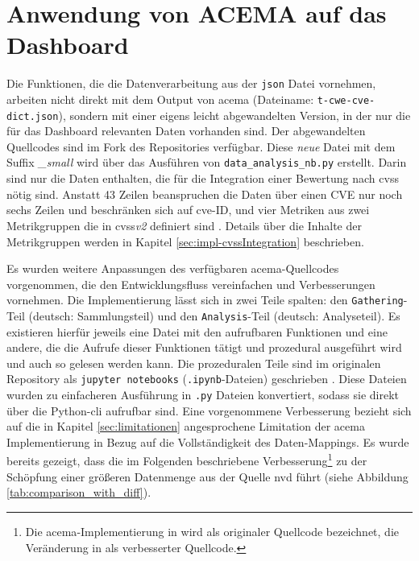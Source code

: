 \section[Anwendung von ACEMA]{Anwendung von ACEMA auf das Dashboard}
\label{sec:impl-anwendungVonAcema}

Die Funktionen, die die Datenverarbeitung aus der \verb|json| Datei vornehmen, arbeiten nicht direkt mit dem Output von \gls{acema} (Dateiname: \verb|t-cwe-cve-dict.json|), sondern mit einer eigens leicht abgewandelten Version, in der nur die für das Dashboard relevanten Daten vorhanden sind. Der abgewandelten Quellcodes sind im Fork \autocite{jesseDumpeldownAcema_oranDev} des Repositories \autocite{klement2023acema}  verfügbar. Diese \textit{neue} Datei mit dem Suffix \textit{\_small} wird über das Ausführen von \verb|data_analysis_nb.py| erstellt. Darin sind nur die Daten enthalten, die für die Integration einer Bewertung nach \gls{cvss} nötig sind. Anstatt 43 Zeilen beanspruchen die Daten über einen CVE nur noch sechs Zeilen und beschränken sich auf \gls{cve}-ID, und vier Metriken aus zwei Metrikgruppen die in \gls{cvss}\textit{v2} definiert sind \autocite{CVSSV2Complete}. Details über die Inhalte der Metrikgruppen werden in Kapitel \ref{sec:impl-cvssIntegration} beschrieben.

Es wurden weitere Anpassungen des verfügbaren \gls{acema}-Quellcodes vorgenommen, die den Entwicklungsfluss vereinfachen und Verbesserungen vornehmen. Die Implementierung lässt sich in zwei Teile spalten: den \verb|Gathering|-Teil (deutsch: Sammlungsteil) und den \verb|Analysis|-Teil (deutsch: Analyseteil). Es existieren hierfür jeweils eine Datei mit den aufrufbaren Funktionen und eine andere, die die Aufrufe dieser Funktionen tätigt und prozedural ausgeführt wird und auch so gelesen werden kann.
Die prozeduralen Teile sind im originalen Repository als \verb|jupyter notebooks| (\verb|.ipynb|-Dateien) geschrieben \autocite{klement2023acema,ProjectJupyter}. Diese Dateien wurden zu einfacheren Ausführung in \verb|.py| Dateien konvertiert, sodass sie direkt über die Python-\gls{cli} aufrufbar sind.
Eine vorgenommene Verbesserung bezieht sich auf die in Kapitel \ref{sec:limitationen} angesprochene Limitation der \gls{acema} Implementierung in Bezug auf die Vollständigkeit des Daten-Mappings. Es wurde bereits gezeigt, dass die im Folgenden beschriebene Verbesserung\footnote{Die \gls{acema}-Implementierung in \autocite{klement2023acema} wird als originaler Quellcode bezeichnet, die Veränderung in \autocite{jesseDumpeldownAcema_oranDev} als verbesserter Quellcode.} zu der Schöpfung einer größeren Datenmenge aus der Quelle \gls{nvd} führt (siehe Abbildung \ref{tab:comparison_with_diff}).


